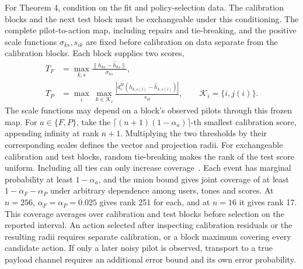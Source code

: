 \documentclass[lineno,pdflatex,sn-nature]{sn-jnl}
\begin{document}
For Theorem 4, condition on the fit and policy-selection data. The calibration blocks and the next test block must be exchangeable under this conditioning. The complete pilot-to-action map, including repairs and tie-breaking, and the positive scale functions \(\sigma_{ks},s_{ik}\) are fixed before calibration on data separate from the calibration blocks. Each block supplies two scores,
\[
\begin{aligned}
 T_F &= \max_{k,s}\frac{\|h_{ks}-\hat h_{ks}\|}{\sigma_{ks}},\\
 T_P &= \max_i\ \max_{k\in\mathcal K_i}
         \frac{|d_i^H(h_{k,s(i)}-\hat h_{k,s(i)})|}{s_{ik}},
 \qquad \mathcal K_i=\{i,j(i)\}.
\end{aligned}
\]
The scale functions may depend on a block's observed pilots through this frozen map. For \(a\in\{F,P\}\), take the \(\lceil(n+1)(1-\alpha_a)\rceil\)-th smallest calibration score, appending infinity at rank \(n+1\). Multiplying the two thresholds by their corresponding scales defines the vector and projection radii. For exchangeable calibration and test blocks, random tie-breaking makes the rank of the test score uniform. Including all ties can only increase coverage~\cite{lei}. Each event has marginal probability at least \(1-\alpha_a\), and the union bound gives joint coverage of at least \(1-\alpha_F-\alpha_P\) under arbitrary dependence among users, tones and scores. At \(n=256\), \(\alpha_F=\alpha_P=0.025\) gives rank 251 for each, and at \(n=16\) it gives rank 17. This coverage averages over calibration and test blocks before selection on the reported interval. An action selected after inspecting calibration residuals or the resulting radii requires separate calibration, or a block maximum covering every candidate action. If only a later noisy pilot is observed, transport to a true payload channel requires an additional error bound and its own error probability.
\end{document}
